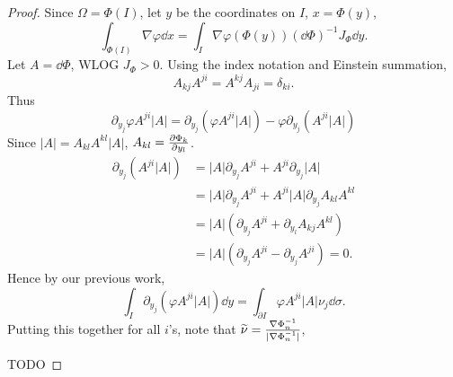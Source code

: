 \begin{proof}[Proof]
    Since $\Omega = \Phi(I)$, let $y$ be the coordinates on $I$, $x = \Phi(y)$,
	\[
	\int_{\Phi(I)} \nabla \varphi \dd x =
	\int_I \nabla \varphi(\Phi(y)) (\dd \Phi)^{-1} J_\Phi \dd y.
	\]
	Let $A = \dd \Phi$, WLOG $J_\Phi > 0$.
	Using the index notation and Einstein summation,
	\[
	A_{kj}A^{ji} = A^{kj}A_{ji} = \delta_{ki}.
	\]
	Thus
	\[
	\partial_{y_j}\varphi A^{ji} |A| = \partial_{y_j}(\varphi A^{ji} |A|)
	- \varphi \partial_{y_j}(A^{ji} |A|)
	\]
	Since $|A| = A_{kl}A^{kl}|A|$, $A_{kl} = \frac{\partial \Phi_k}{\partial y_l}$.
	\begin{align*}
	    \partial_{y_j} (A^{ji} |A|)
		&= |A|\partial_{y_j}A^{ji} + A^{ji}\partial_{y_j}|A|\\
		&= |A|\partial_{y_j} A^{ji} + A^{ji}|A| \partial_{y_j}A_{kl}A^{kl}\\
		&= |A|(\partial_{y_j} A^{ji} + \partial_{y_l}A_{kj}A^{kl})\\
		&= |A|(\partial_{y_j}A^{ji} - \partial_{y_j}A^{ji}) = 0.
	\end{align*}
	Hence by our previous work,
	\[
	\int_I \partial_{y_j}(\varphi A^{ji} |A|)\dd y
	= \int_{\partial I} \varphi A^{ji}|A| \nu_j \dd \sigma.
	\]
	Putting this together for all $i$'s,
	note that $\widetilde{\nu} = \frac{\nabla \Phi^{-1}_n}{|\nabla \Phi^{-1}_n|}$,

	TODO
\end{proof}
